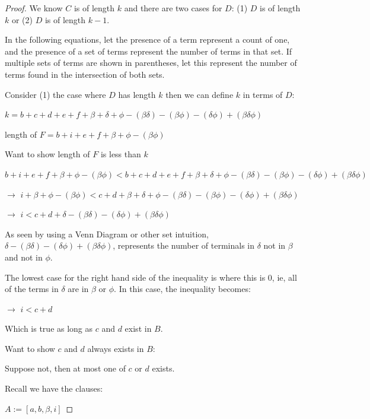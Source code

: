 \documentclass[manuscript]{acmart}
\begin{document}
\begin{proof}
        We know $C$ is of length $k$ and there are two cases for $D$: (1) $D$ is of length $k$ or (2) $D$ is of length $k-1$.

        In the following equations, let the presence of a term represent a count of one, and the presence of a set of terms represent the number of terms in that set. If multiple sets of terms are shown in parentheses, let this represent the number of terms found in the intersection of both sets.

        Consider (1) the case where $D$ has length $k$ then we can define $k$ in terms of $D$:
        
        $k = b + c + d + e + f + \beta + \delta + \phi - (\beta \delta) - 
        (\beta \phi) - (\delta \phi) + (\beta \delta \phi)$

        length of $F = b + i + e + f + \beta + \phi - (\beta \phi)$

        Want to show length of $F$ is less than $k$

        $b + i + e + f + \beta + \phi - (\beta \phi) < 
        b + c + d + e + f + \beta + \delta + \phi - (\beta \delta) - 
        (\beta \phi) - (\delta \phi) + (\beta \delta \phi)$

        $\rightarrow$ $i + \beta + \phi - (\beta \phi) < 
        c + d + \beta + \delta + \phi - (\beta \delta) - 
        (\beta \phi) - (\delta \phi) + (\beta \delta \phi)$

        $\rightarrow$ $i < 
        c + d + \delta - (\beta \delta) - (\delta \phi) + (\beta \delta \phi)$

        As seen by using a Venn Diagram or other set intuition, $\delta - 
        (\beta \delta) - (\delta \phi) + (\beta \delta \phi)$, 
        represents the number of terminals in $\delta$ not in $\beta$
        and not in $\phi$.

        The lowest case for the right hand side of the inequality is where 
        this is 0, ie, all of the terms in $\delta$ are in $\beta$ or 
        $\phi$. In this case, the inequality becomes:

        $\rightarrow$ $i < c + d$

        Which is true as long as $c$ and $d$ exist in $B$.

        Want to show $c$ and $d$ always exists in $B$:

        Suppose not, then at most one of $c$ or $d$ exists.

        Recall we have the clauses:

        $A := [a, b, \beta, i]$
        

\end{proof}
\end{document}
